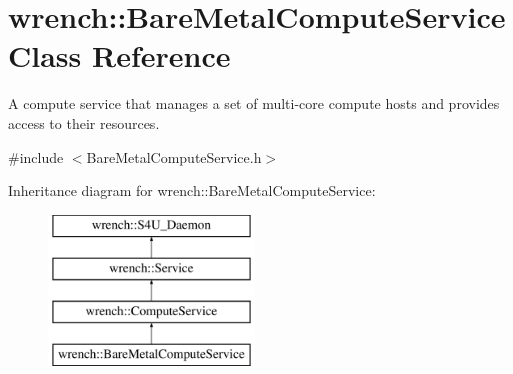 \hypertarget{classwrench_1_1_bare_metal_compute_service}{}\section{wrench\+:\+:Bare\+Metal\+Compute\+Service Class Reference}
\label{classwrench_1_1_bare_metal_compute_service}


A compute service that manages a set of multi-\/core compute hosts and provides access to their resources.  




{\ttfamily \#include $<$Bare\+Metal\+Compute\+Service.\+h$>$}

Inheritance diagram for wrench\+:\+:Bare\+Metal\+Compute\+Service\+:\begin{figure}[H]
\begin{center}
\leavevmode
\includegraphics[height=4.000000cm]{classwrench_1_1_bare_metal_compute_service}
\end{center}
\end{figure}
